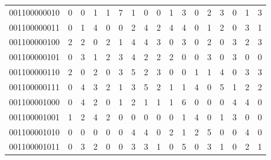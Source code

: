 \documentclass[10pt,a4paper]{article}
\begin{document}
\begin{longtable}{ |c|c|c|c|c|c|c|c|c|c|c|c|c|c|c|c|c| }
    001100000010              & 0                            & 0                                & 1                            & 1                              & 7   & 1   & 0   & 0   & 1   & 3   & 0   & 2   & 3   & 0   & 1   & 3   \\
    001100000011              & 0                            & 1                                & 4                            & 0                              & 0   & 2   & 4   & 2   & 4   & 4   & 0   & 1   & 2   & 0   & 3   & 1   \\
    001100000100              & 2                            & 2                                & 0                            & 2                              & 1   & 4   & 4   & 3   & 0   & 3   & 0   & 2   & 0   & 3   & 2   & 3   \\
    001100000101              & 0                            & 3                                & 1                            & 2                              & 3   & 4   & 2   & 2   & 2   & 0   & 0   & 3   & 0   & 3   & 0   & 0   \\
    001100000110              & 2                            & 0                                & 2                            & 0                              & 3   & 5   & 2   & 3   & 0   & 0   & 1   & 1   & 4   & 0   & 3   & 3   \\
    001100000111              & 0                            & 4                                & 3                            & 2                              & 1   & 3   & 5   & 2   & 1   & 1   & 4   & 0   & 5   & 1   & 2   & 2   \\
    001100001000              & 0                            & 4                                & 2                            & 0                              & 1   & 2   & 1   & 1   & 1   & 6   & 0   & 0   & 0   & 4   & 4   & 0   \\
    001100001001              & 1                            & 2                                & 4                            & 2                              & 0   & 0   & 0   & 0   & 0   & 1   & 4   & 0   & 1   & 3   & 0   & 0   \\
    001100001010              & 0                            & 0                                & 0                            & 0                              & 0   & 4   & 4   & 0   & 2   & 1   & 2   & 5   & 0   & 0   & 4   & 0   \\
    001100001011              & 0                            & 3                                & 2                            & 0                              & 0   & 3   & 3   & 1   & 0   & 5   & 0   & 3   & 1   & 0   & 2   & 1   \\

\end{longtable}
\end{document}
